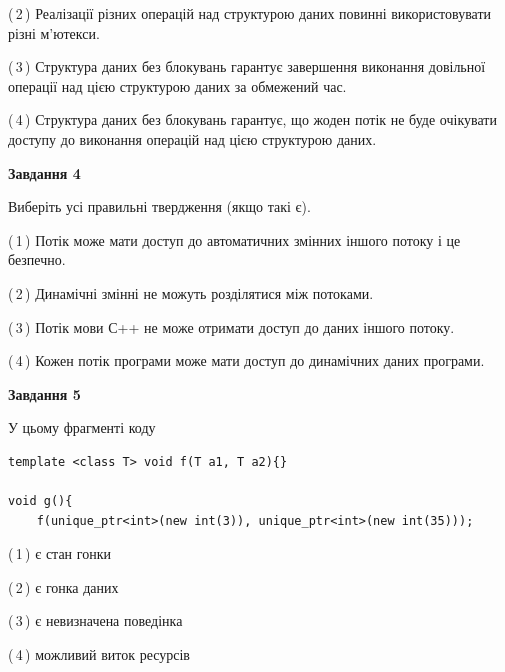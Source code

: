 \documentclass[12pt, ukrainian]{article}
\begin{document}
\begin {large}
{(\,2\,) Реалізації різних операцій над структурою даних повинні використовувати різні м’ютекси.%

(\,3\,) Структура даних без блокувань гарантує завершення виконання довільної операції над цією структурою даних за обмежений час.%

(\,4\,) Структура даних без блокувань гарантує, що жоден потік не буде очікувати доступу до виконання операцій над цією структурою даних.%



\begin{center}
\textbf{Завдання 4}
\end{center}
Виберіть усі правильні твердження (якщо такі є).\par
\vspace{2mm}

(\,1\,) Потік може мати доступ до автоматичних змінних іншого потоку і це безпечно.%

(\,2\,) Динамічні змінні не можуть розділятися між потоками.%

(\,3\,) Потік мови С++ не може отримати доступ до даних іншого потоку.%

(\,4\,) Кожен потік програми може мати доступ до динамічних даних програми.%



\begin{center}
\textbf{Завдання 5}
\end{center}
У цьому фрагменті коду
\begin{verbatim}
template <class T> void f(T a1, T a2){}

void g(){
    f(unique_ptr<int>(new int(3)), unique_ptr<int>(new int(35)));
\end{verbatim}

(\,1\,) є стан гонки%

(\,2\,) є гонка даних%

(\,3\,) є невизначена поведінка%

(\,4\,) можливий виток ресурсів%


}
\end {large}
\end{document}
